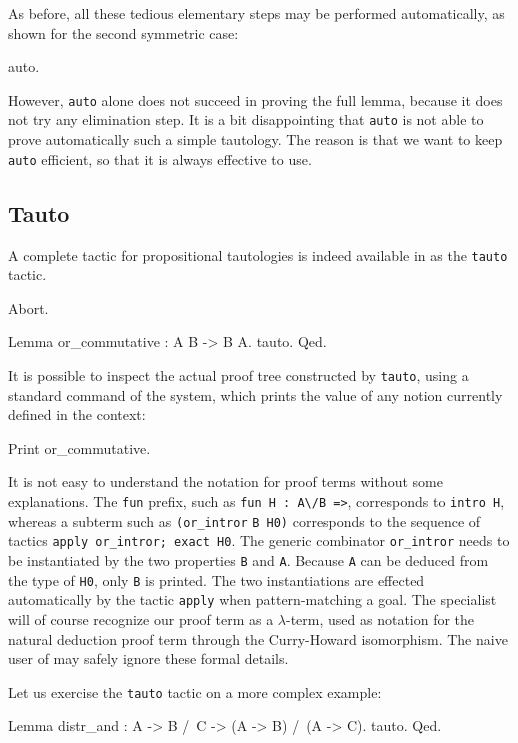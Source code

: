 \documentclass[11pt,a4paper]{book}
\begin{document}
As before, all these tedious elementary steps may be performed automatically,
as shown for the second symmetric case:

\begin{coq_example}
auto.
\end{coq_example}

However, \verb:auto: alone does not succeed in proving the full lemma, because
it does not try any elimination step.
It is a bit disappointing that \verb:auto: is not able to prove automatically
such a simple tautology. The reason is that we want to keep
\verb:auto: efficient, so that it is always effective to use.

\subsection{Tauto}

A complete tactic for propositional
tautologies is indeed available in \Coq{} as the \verb:tauto: tactic.
\begin{coq_eval}
Abort.
\end{coq_eval}
\begin{coq_example}
Lemma or_commutative : A \/ B -> B \/ A.
tauto.
Qed.
\end{coq_example}

It is possible to inspect the actual proof tree constructed by \verb:tauto:,
using a standard command of the system, which prints the value of any notion
currently defined in the context:
\begin{coq_example}
Print or_commutative.
\end{coq_example}

It is not easy to understand the notation for proof terms without some
explanations. The \texttt{fun} prefix, such as \verb+fun H : A\/B =>+,
corresponds
to \verb:intro H:, whereas a subterm such as
\verb:(or_intror: \verb:B H0):
corresponds to the sequence of tactics \verb:apply or_intror; exact H0:.
The generic combinator \verb:or_intror: needs to be instantiated by
the two properties \verb:B: and \verb:A:. Because \verb:A: can be
deduced from the type of \verb:H0:, only  \verb:B: is printed.
The two instantiations are effected automatically by the tactic
\verb:apply: when pattern-matching a goal. The specialist will of course
recognize our proof term as a $\lambda$-term, used as notation for the
natural deduction proof term through the Curry-Howard isomorphism. The
naive user of \Coq{} may safely ignore these formal details.

Let us exercise the \verb:tauto: tactic on a more complex example:
\begin{coq_example}
Lemma distr_and : A -> B /\ C -> (A -> B) /\ (A -> C).
tauto.
Qed.
\end{coq_example}
\end{document}
